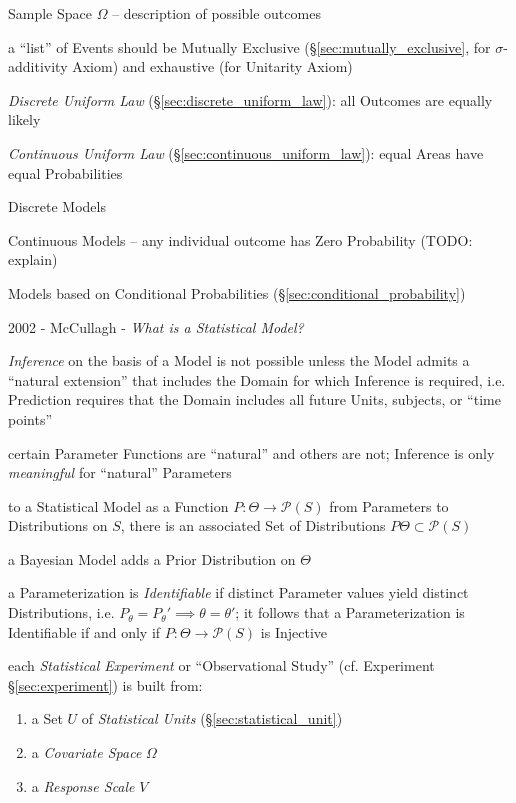 Sample Space $\Omega$ -- description of possible outcomes

a ``list'' of Events should be Mutually Exclusive
(\S\ref{sec:mutually_exclusive}, for $\sigma$-additivity Axiom) and exhaustive
(for Unitarity Axiom)

\emph{Discrete Uniform Law} (\S\ref{sec:discrete_uniform_law}): all Outcomes are
equally likely

\emph{Continuous Uniform Law} (\S\ref{sec:continuous_uniform_law}): equal Areas
have equal Probabilities

Discrete Models

Continuous Models -- any individual outcome has Zero Probability (TODO: explain)

Models based on Conditional Probabilities (\S\ref{sec:conditional_probability})

\asterism

2002 - McCullagh - \emph{What is a Statistical Model?}

\emph{Inference} on the basis of a Model is not possible unless the Model admits
a ``natural extension'' that includes the Domain for which Inference is
required, i.e. Prediction requires that the Domain includes all future Units,
subjects, or ``time points''

certain Parameter Functions are ``natural'' and others are not; Inference is
only \emph{meaningful} for ``natural'' Parameters

to a Statistical Model as a Function $P : \Theta \to \mathcal{P}(S)$
from Parameters to Distributions on $S$, there is an associated Set of
Distributions $P \Theta \subset \mathcal{P}(S)$

a Bayesian Model adds a Prior Distribution on $\Theta$

a Parameterization is \emph{Identifiable} if distinct Parameter values yield
distinct Distributions, i.e. $P_\theta = P_\theta' \implies \theta = \theta'$;
it follows that a Parameterization is Identifiable if and only if
$P : \Theta \to \mathcal{P}(S)$ is Injective

each \emph{Statistical Experiment} or ``Observational Study'' (cf. Experiment
\S\ref{sec:experiment}) is built from:
\begin{enumerate}
  \item a Set $U$ of \emph{Statistical Units} (\S\ref{sec:statistical_unit})
  \item a \emph{Covariate Space} $\Omega$
  \item a \emph{Response Scale} $V$
\end{enumerate}

